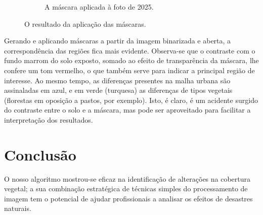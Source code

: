 \documentclass{article}
\begin{document}
\begin{figure}[H]
\begin{subfigure}[b]{0.48\textwidth}
        \caption{A máscara aplicada à foto de 2025.}
        \label{2025}
    \end{subfigure}
    \caption{O resultado da aplicação das máscaras.}
    \label{máscara}
\end{figure}

Gerando e aplicando máscaras a partir da imagem binarizada e aberta, a correspondência das regiões fica mais evidente. Observa-se que o contraste com o fundo marrom do solo exposto, somado ao efeito de transparência da máscara, lhe confere um tom vermelho, o que também serve para indicar a principal região de interesse. Ao mesmo tempo, as diferenças presentes na malha urbana são assinaladas em azul, e em verde (turquesa) as diferenças de tipos vegetais (florestas em oposição a pastos, por exemplo). Isto, é claro, é um acidente surgido do contraste entre o solo e a máscara, mas pode ser aproveitado para facilitar a interpretação dos resultados.

\section{Conclusão}

O nosso algoritmo mostrou-se eficaz na identificação de alterações na cobertura vegetal; a sua combinação estratégica de técnicas simples do processamento de imagem tem o potencial de ajudar profissionais a analisar os efeitos de desastres naturais.

\nocite{*}


\end{document}
